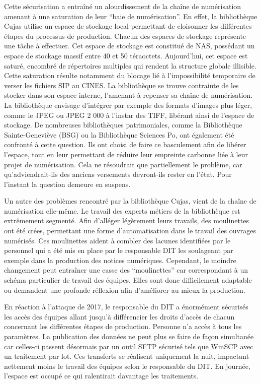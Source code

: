 Cette sécurisation a entraîné un alourdissement de la chaîne de numérisation amenant à une saturation de leur \enquote{baie de numérisation}. En effet, la bibliothèque Cujas utilise un espace de stockage local permettant de cloisonner les différentes étapes du processus de production. Chacun des espaces de stockage représente une tâche à effectuer. Cet espace de stockage est constitué de NAS, possédant un espace de stockage massif entre 40 et 50 téraoctets. Aujourd'hui, cet espace est saturé, encombré de répertoires multiples qui rendent la structure globale illisible. Cette saturation résulte notamment du blocage lié à l'impossibilité temporaire de verser les fichiers SIP au CINES. La bibliothèque se trouve contrainte de les stocker dans son espace interne, l'amenant à repenser sa chaîne de numérisation. La bibliothèque envisage d'intégrer par exemple des formats d'images plus léger, comme le JPEG ou JPEG 2 000 à l'instar des TIFF, libérant ainsi de l'espace de stockage. De nombreuses bibliothèques patrimoniales, comme la Bibliothèque Sainte-Geneviève (BSG) ou la Bibliothèque Sciences Po, ont également été confronté à cette question. Ils ont choisi de faire ce basculement afin de libérer l'espace, tout en leur permettant de réduire leur empreinte carbonne liée à leur projet de numérisation. Cela ne résoudrait que partiellement le problème, car qu'adviendrait-ils des anciens versements devront-ils rester en l'état. Pour l'instant la question demeure en suspens. 

Un autre des problèmes rencontré par la bibliothèque Cujas, vient de la chaîne de numérisation elle-même. Le travail des experts métiers de la bibliothèque est extrêmement segmenté. Afin d'alléger légèrement leurs travails, des moulinettes ont été crées, permettant une forme d'automatisation dans le travail des ouvrages numérisés. Ces moulinettes aident à combler des lacunes identifiées par le personnel qui a été mis en place par le responsable DIT les soulageant par exemple dans la production des notices numériques. Cependant, le moindre changement peut entraîner une casse des \enquote{moulinettes} car correspondant à un schéma particulier de travail des équipes. Elles sont donc difficilement adaptable ou demandent une profonde réflexion afin d'améliorer au mieux la production. 

En réaction à l'attaque de 2017, le responsable du DIT a énormément sécurisés les accès des équipes allant jusqu'à différencier les droits d'accès de chacun concernant les différentes étapes de production. Personne n'a accès à tous les paramètres. La publication des données ne peut plus se faire de façon simultanée car celles-ci passent désormais par un outil SFTP sécurisé tels que WinSCP avec un traitement par lot. Ces transferts se réalisent uniquement la nuit, impactant nettement moins le travail des équipes selon le responsable du DIT. En journée, l'espace est occupé ce qui ralentirait davantage les traitements.

